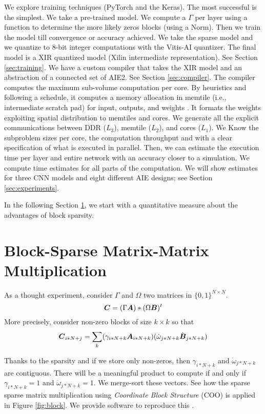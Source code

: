 \documentclass[sigconf]{acmart}
\begin{document}
We explore training techniques (PyTorch and the Keras).  The most
successful is the simplest. We take a pre-trained model. We compute a
$\Gamma$ per layer using a function to determine the more likely zeros
blocks (using a Norm). Then we train the model till convergence or
accuracy achieved. We take the sparse model and we quantize to 8-bit
integer computations with the Vitis-AI quantizer. The final model is a
XIR quantized model (Xilin intermediate representation). See Section
\ref{sec:training}. We have a custom compiler that takes the XIR model
and an abstraction of a connected set of AIE2. See Section
\ref{sec:compiler}. The compiler computes the maximum sub-volume
computation per core. By heuristics and following a schedule, it
computes a memory allocation in memtile (i.e., intermediate scratch
pad) for input, outputs, and weights . It formats the weights
exploiting spatial distribution to memtiles and cores. We generate all
the explicit communications between DDR ($L_3$), memtile ($L_2$), and
cores ($L_1$). We Know the subproblem sizes per core, the computation
throughput and with a clear specification of what is executed in
parallel. Then, we can estimate the execution time per layer and
entire network with an accuracy closer to a simulation.  We compute
time estimates for all parts of the computation. We will show
estimates for three CNN models and eight different AIE designs; see
Section \ref{sec:experiments}.

In the following Section \ref{sec:motivation}, we start with a
quantitative measure about the advantages of block sparsity.

\section{Block-Sparse Matrix-Matrix Multiplication}
\label{sec:motivation}

As a thought experiment, consider $\Gamma$ and $\Omega$ two matrices
in $\{0,1\}^{N\times N}$.
\begin{equation}
  {\boldsymbol C} = (\Gamma {\boldsymbol A}) * (\Omega {\boldsymbol B})^t
\end{equation}
More precisely, consider non-zero blocks of size $k\times k$ so that
\begin{equation}
  {\boldsymbol C}_{i*N+j} = \sum_k ( \gamma_{i*N+k} {\boldsymbol A}_{i*N+k} ) (\dot{\omega}_{j*N+k} \dot{{\boldsymbol B}}_{j*N+k})
\end{equation}


Thanks to the sparsity and if we store only non-zeros, then
$\gamma_{i*N+k}$ and $\dot{\omega}_{j*N+k}$ are contiguous. There will
be a meaningful product to compute if and only if $\gamma_{i*N+k} =1$
and $\dot{\omega}_{j*N+k} =1$.  We merge-sort these vectors.  See how
the sparse sparse matrix multiplication using {\em Coordinate Block
  Structure} (COO) is applied in Figure \ref{fig:block}.  We provide
software to reproduce this \cite{PaoloG2020}.
\end{document}
